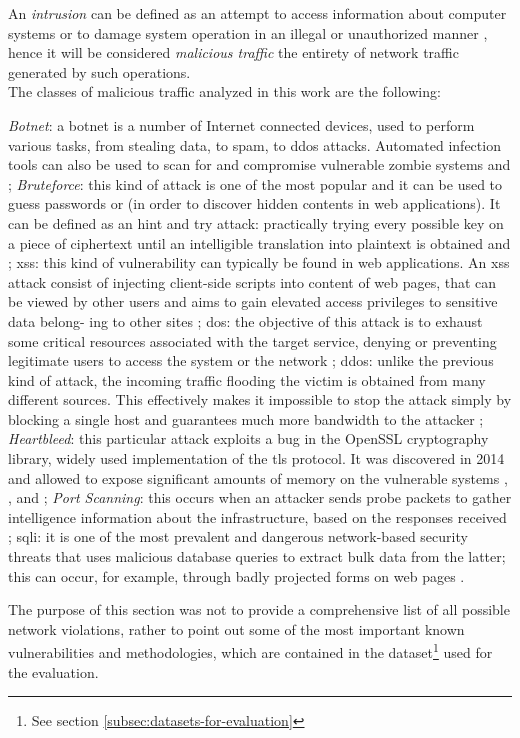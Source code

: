 An \textit{intrusion} can be defined as an attempt to access information about computer systems or to damage system operation in an illegal or unauthorized manner \cite{Liu2019}, hence it will be considered \textit{malicious traffic} the entirety of network traffic generated by such operations. \\
The classes of malicious traffic analyzed in this work are the following:

\begin{itemize}
    \itemAR \textit{Botnet}: a botnet is a number of Internet connected devices, used to perform various tasks, from stealing data, to spam, to \gls{ddos} attacks. Automated infection tools can also be used to scan for and compromise vulnerable zombie systems \cite[p.~250]{Sharafaldin2019} and \cite{icissp18};
    \itemAR \textit{Bruteforce}: this kind of attack is one of the most popular and it can be used to guess passwords or  (in order to discover hidden contents in web applications). It can be defined as an hint and try attack: practically trying every possible key on a piece of ciphertext until an intelligible translation into plaintext is obtained \cite[p.~43]{Sharafaldin2019} and \cite{icissp18};
    \itemAR \gls{xss}: this kind of vulnerability can typically be found in web applications. An \gls{xss} attack consist of injecting client-side scripts into  content of web pages, that can be viewed by other users and aims to gain elevated access privileges to sensitive data belong- ing to other sites \cite[p.~387]{Sharafaldin2019};
    \itemAR \gls{dos}: the objective of this attack is to exhaust some critical resources associated with the target service, denying or preventing legitimate users to access the system or the network \cite[p.~241]{Sharafaldin2019};
    \itemAR \gls{ddos}: unlike the previous kind of attack, the incoming traffic flooding the victim is obtained from many different sources. This effectively makes it impossible to stop the attack simply by blocking a single host and guarantees much more bandwidth to the attacker \cite[p.~241]{Sharafaldin2019};
    \itemAR \textit{Heartbleed}: this particular attack exploits a bug in the OpenSSL cryptography library, widely used implementation of the \gls{tls} protocol. It was discovered in 2014 and allowed to expose significant amounts of memory on the vulnerable systems \cite{Carvalho2014}, \cite[p.~706]{Sharafaldin2019}, \cite{icissp18} and \cite{Stallings2014};
    \itemAR \textit{Port Scanning}: this occurs when an attacker sends probe packets to gather intelligence information about the infrastructure, based on the responses received \cite{icissp18};
    \itemAR \gls{sqli}: it is one of the most prevalent and dangerous network-based security threats that uses malicious database queries to extract bulk data from the latter; this can occur, for example, through badly projected forms on web pages \cite[p.~163]{Sharafaldin2019}.
\end{itemize}
The purpose of this section was not to provide a comprehensive list of all possible network violations, rather to point out some of the most important known vulnerabilities and methodologies, which are contained in the dataset\footnote{See section \ref{subsec:datasets-for-evaluation}} used for the evaluation.

